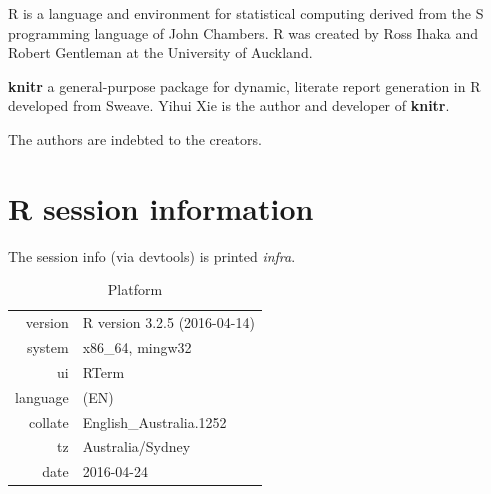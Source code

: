 \begin{subappendices}
R is a language and environment for statistical computing derived from the S programming language of John Chambers. R was created by Ross Ihaka and Robert Gentleman at the University of Auckland. 

\textbf{knitr} a general-purpose package for dynamic, literate report generation in R developed from Sweave. Yihui Xie is the author and developer of \textbf{knitr}. 

The authors are indebted to the creators.

\section{R session information}
The session info (via devtools) is printed \emph{infra}.




\begin{table}[!htb]
\centering
\captionsetup{justification=centering}
\caption{Platform}
\begin{tabular}{rl}
  \toprule
 version & R version 3.2.5 (2016-04-14) \\ 
  system & x86\_64, mingw32 \\ 
  ui & RTerm \\ 
  language & (EN) \\ 
  collate & English\_Australia.1252 \\ 
  tz & Australia/Sydney \\ 
  date & 2016-04-24 \\ 
   \bottomrule
\end{tabular}
\end{table}

\clearpage



\end{subappendices}

